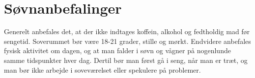 \section{Søvnanbefalinger}


Generelt anbefales det, at der ikke indtages koffein, alkohol og fedtholdig mad før sengetid. Soverummet bør være 18-21 grader, stille og mørkt. Endvidere anbefales fysisk aktivitet om dagen, og at man falder i søvn og vågner på nogenlunde samme tidspunkter hver dag. Dertil bør man først gå i seng, når man er træt, og man bør ikke arbejde i soveværelset eller spekulere på problemer. \cite{Jennum2015}

